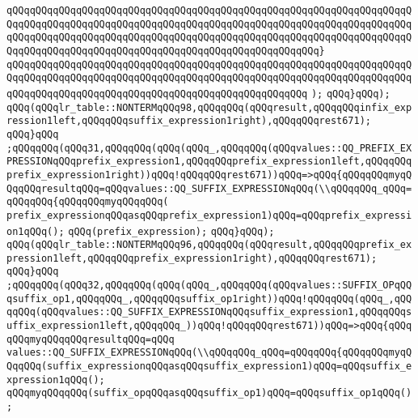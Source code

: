 \verb|qQQqqQQqqQQqqQQqqQQqqQQqqQQqqQQqqQQqqQQqqQQqqQQqqQQqqQQqqQQqqQQqqQQqqQQqqQQqqQQqqQQqqQQqqQQqqQQqqQQqqQQqqQQqqQQqqQQqqQQqqQQqqQQqqQQqqQQqqQQqqQQqqQQqqQQqqQQqqQQqqQQqqQQqqQQqqQQqqQQqqQQqqQQqqQQqqQQqqQQqqQQqqQQqqQQqqQQqqQQqqQQqqQQqqQQqqQQqqQQqqQQqqQQqqQQqqQQqqQQqqQQq}|\newline
\verb|qQQqqQQqqQQqqQQqqQQqqQQqqQQqqQQqqQQqqQQqqQQqqQQqqQQqqQQqqQQqqQQqqQQqqQQqqQQqqQQqqQQqqQQqqQQqqQQqqQQqqQQqqQQqqQQqqQQqqQQqqQQqqQQqqQQqqQQqqQQqqQQqqQQqqQQqqQQqqQQqqQQqqQQqqQQqqQQqqQQqqQQqqQQqqQQq|\newline
\verb|);|\newline
\verb|qQQq}qQQq);|\newline
\verb|qQQq(qQQqlr_table::NONTERMqQQq98,qQQqqQQq(qQQqresult,qQQqqQQqinfix_expression1left,qQQqqQQqsuffix_expression1right),qQQqqQQqrest671);|\newline
\verb|qQQq}qQQq|\newline
\verb|;qQQqqQQq(qQQq31,qQQqqQQq(qQQq(qQQq_,qQQqqQQq(qQQqvalues::QQ_PREFIX_EXPRESSIONqQQqprefix_expression1,qQQqqQQqprefix_expression1left,qQQqqQQqprefix_expression1right))qQQq!qQQqqQQqrest671))qQQq=>qQQq{qQQqqQQqmyqQQqqQQqresultqQQq=qQQqvalues::QQ_SUFFIX_EXPRESSIONqQQq(\\qQQqqQQq_qQQq=qQQqqQQq{qQQqqQQqmyqQQqqQQq(|\newline
\verb|prefix_expressionqQQqasqQQqprefix_expression1)qQQq=qQQqprefix_expression1qQQq();|\newline
\verb|qQQq(prefix_expression);|\newline
\verb|qQQq}qQQq);|\newline
\verb|qQQq(qQQqlr_table::NONTERMqQQq96,qQQqqQQq(qQQqresult,qQQqqQQqprefix_expression1left,qQQqqQQqprefix_expression1right),qQQqqQQqrest671);|\newline
\verb|qQQq}qQQq|\newline
\verb|;qQQqqQQq(qQQq32,qQQqqQQq(qQQq(qQQq_,qQQqqQQq(qQQqvalues::SUFFIX_OPqQQqsuffix_op1,qQQqqQQq_,qQQqqQQqsuffix_op1right))qQQq!qQQqqQQq(qQQq_,qQQqqQQq(qQQqvalues::QQ_SUFFIX_EXPRESSIONqQQqsuffix_expression1,qQQqqQQqsuffix_expression1left,qQQqqQQq_))qQQq!qQQqqQQqrest671))qQQq=>qQQq{qQQqqQQqmyqQQqqQQqresultqQQq=qQQq|\newline
\verb|values::QQ_SUFFIX_EXPRESSIONqQQq(\\qQQqqQQq_qQQq=qQQqqQQq{qQQqqQQqmyqQQqqQQq(suffix_expressionqQQqasqQQqsuffix_expression1)qQQq=qQQqsuffix_expression1qQQq();|\newline
\verb|qQQqmyqQQqqQQq(suffix_opqQQqasqQQqsuffix_op1)qQQq=qQQqsuffix_op1qQQq();|\newline
